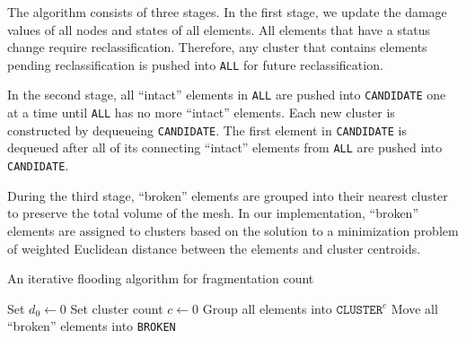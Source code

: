 The algorithm consists of three stages. In the first stage, we update the damage values of all nodes and states of all elements. All elements that have a status change require reclassification. Therefore, any cluster that contains elements pending reclassification is pushed into \texttt{ALL} for future reclassification.

In the second stage, all ``intact'' elements in \texttt{ALL} are pushed into \texttt{CANDIDATE} one at a time until \texttt{ALL} has no more ``intact'' elements. Each new cluster is constructed by dequeueing \texttt{CANDIDATE}. The first element in \texttt{CANDIDATE} is dequeued after all of its connecting ``intact'' elements from \texttt{ALL} are pushed into \texttt{CANDIDATE}.

During the third stage, ``broken'' elements are grouped into their nearest cluster to preserve the total volume of the mesh. In our implementation,  ``broken'' elements are assigned to clusters based on the solution to a minimization problem of weighted Euclidean distance between the elements and cluster centroids.

\begin{algorithm}[!htb]
  \caption{An iterative flooding algorithm for fragmentation count}
  \begin{algorithmic}[1]
    \State Set $d_0 \leftarrow 0$
    \State Set cluster count $c \leftarrow 0$
    \State Group all elements into $\texttt{CLUSTER}^c$
    \State Move all ``broken'' elements into \texttt{BROKEN}
    \EndIf
    \EndFor
    \Else
    \Else
    \EndIf
    \EndFor
    \EndWhile
    \EndIf
    \EndWhile
    \EndFor
  \end{algorithmic}
  \label{alg: flooding}
\end{algorithm}


